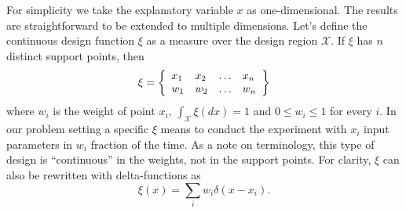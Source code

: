 \documentclass[12pt]{iopart}
\begin{document}
For simplicity we take the explanatory variable $x$ as one-dimensional. The results are straightforward to be extended to multiple dimensions.
Let's define the continuous design function $\xi$ as a measure over the design region $\mathcal{X}$. If $\xi$ has $n$ distinct support points, then
\begin{equation}
\xi = \left\{
  \begin{array}{l l l l}
    x_1 & x_2 & \ldots & x_n\\
    w_1 & w_2 & \ldots & w_n\\
  \end{array} \right \}
\label{eq:xicont}
\end{equation}
where $w_i$ is the weight of point $x_i$, $\int_{\mathcal{X}}\xi(dx) = 1$ and $0 \leq w_i \leq 1$ for every $i$. In our problem setting a specific $\xi$ means to conduct the experiment with $x_i$ input parameters in $w_i$ fraction of the time. As a note on terminology, this type of design is ``continuous'' in the weights, not in the support points. For clarity, $\xi$ can also be rewritten with delta-functions as
\begin{equation}
\xi(x) = \sum_i w_i \delta(x - x_i).
\label{eq:xidelta}
\end{equation}
\end{document}
